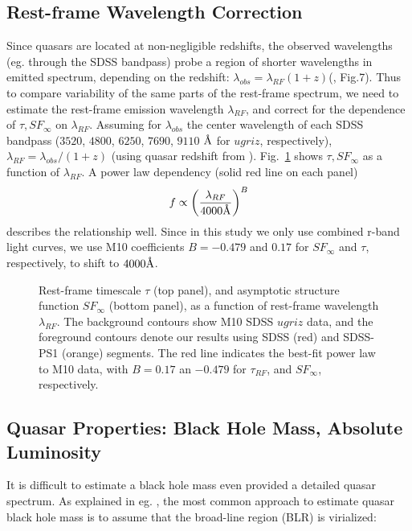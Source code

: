 \documentclass[twocolumn]{aastex62}
\let\oldAA\AA
\renewcommand{\AA}{\text{\normalfont\oldAA}}
\begin{document}
\subsection{Rest-frame Wavelength Correction}
Since quasars are located at non-negligible redshifts, the observed wavelengths (eg. through the SDSS bandpass) probe a region of shorter wavelengths in emitted spectrum, depending on the redshift:  $\lambda_{obs} = \lambda_{RF}  (1+z)$(\citealt{shen2018}, Fig.7). Thus to compare variability of the same parts of the rest-frame spectrum, we need to estimate the rest-frame emission wavelength $\lambda_{RF}$, and correct for the dependence of $\tau, SF_{\infty}$ on $\lambda_{RF}$. Assuming for $\lambda_{obs}$ the center wavelength of each SDSS bandpass ($3520$, $4800$, $6250$, $7690$, $9110$ $\mbox{\AA}$ for $ugriz$, respectively), $\lambda_{RF} = \lambda_{obs} / (1+z)$ (using quasar redshift from \citealt{schneider2010}). Fig.~\ref{fig:wavelength_dependence} shows $\tau, SF_{\infty}$  as a function of  $\lambda_{RF}$. A power law dependency (solid red line on each panel)
\begin{equation}
f \propto \left( \frac{\lambda_{RF}}{4000 \mbox{\AA}} \right)^{B}
\end{equation}
describes the relationship well. Since in this study we only use combined r-band light curves,  we use M10 coefficients $B=-0.479$ and $0.17$ for $SF_{\infty}$ and $\tau$, respectively, to shift to $4000 \mbox{\AA}$. 

  
\begin{figure} %
\caption{Rest-frame timescale $\tau$ (top panel), and asymptotic structure function $SF_{\infty}$ (bottom panel), as a function of rest-frame wavelength $\lambda_{RF}$. The background contours show M10 SDSS $ugriz$ data, and the foreground contours  denote our results using  SDSS (red) and SDSS-PS1 (orange) segments. The red line indicates the best-fit power law to M10 data, with $B=0.17$ an $-0.479$ for $\tau_{RF}$, and $SF_{\infty}$, respectively.}
\label{fig:wavelength_dependence}
\end{figure} 

\subsection{Quasar Properties: Black Hole Mass, Absolute Luminosity}

It is difficult to estimate a black hole mass even provided a detailed quasar spectrum.  As explained in eg. \citet{shen2008}, the most common approach to estimate quasar black hole mass is to assume that the broad-line region (BLR) is virialized:
\end{document}
